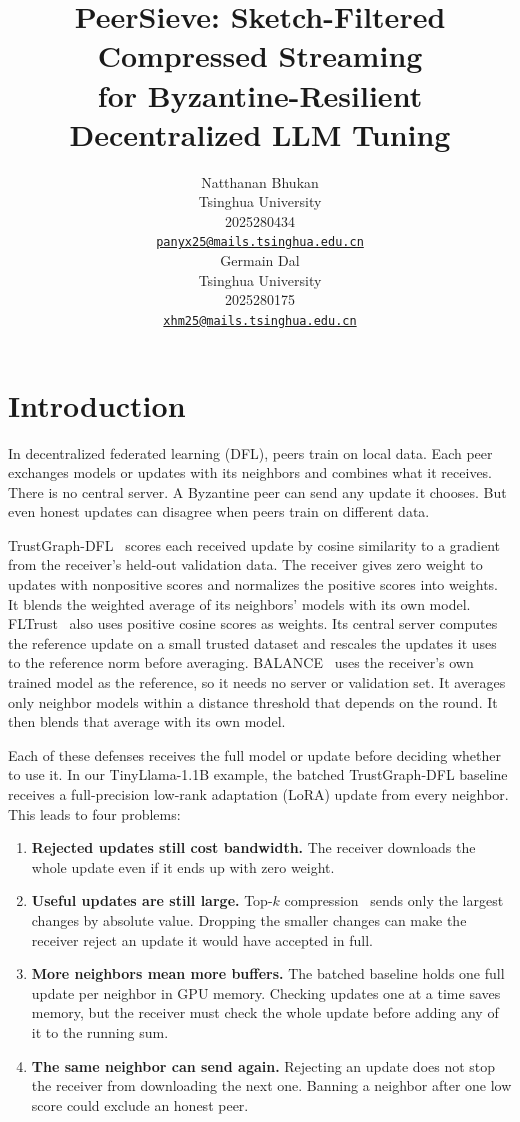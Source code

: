 \documentclass{article}
\title{PeerSieve: Sketch-Filtered Compressed Streaming\\for Byzantine-Resilient Decentralized LLM Tuning}
\author{%
  Natthanan Bhukan \\
  Tsinghua University \\
  2025280434 \\
  \href{mailto:panyx25@mails.tsinghua.edu.cn}{\texttt{panyx25@mails.tsinghua.edu.cn}} \\
  \And
  Germain Dal \\
  Tsinghua University \\
  2025280175 \\
  \href{mailto:xhm25@mails.tsinghua.edu.cn}{\texttt{xhm25@mails.tsinghua.edu.cn}} \\
}
\begin{document}
\raggedbottom
\maketitle

\section{Introduction}
\label{sec:motivation}

In decentralized federated learning (DFL), peers train on local data. Each peer exchanges models or updates with its neighbors and combines what it receives. There is no central server. A Byzantine peer can send any update it chooses. But even honest updates can disagree when peers train on different data.

TrustGraph-DFL~\cite{trustgraph2026} scores each received update by cosine similarity to a gradient from the receiver's held-out validation data. The receiver gives zero weight to updates with nonpositive scores and normalizes the positive scores into weights. It blends the weighted average of its neighbors' models with its own model. FLTrust~\cite{cao2021fltrust} also uses positive cosine scores as weights. Its central server computes the reference update on a small trusted dataset and rescales the updates it uses to the reference norm before averaging. BALANCE~\cite{fang2024balance} uses the receiver's own trained model as the reference, so it needs no server or validation set. It averages only neighbor models within a distance threshold that depends on the round. It then blends that average with its own model.

Each of these defenses receives the full model or update before deciding whether to use it. In our TinyLlama-1.1B example, the batched TrustGraph-DFL baseline receives a full-precision low-rank adaptation (LoRA) update from every neighbor. This leads to four problems:
\begin{enumerate}
  \item \textbf{Rejected updates still cost bandwidth.} The receiver downloads the whole update even if it ends up with zero weight.
  \item \textbf{Useful updates are still large.} Top-$k$ compression~\cite{karimireddy2019efsgd} sends only the largest changes by absolute value. Dropping the smaller changes can make the receiver reject an update it would have accepted in full.
  \item \textbf{More neighbors mean more buffers.} The batched baseline holds one full update per neighbor in GPU memory. Checking updates one at a time saves memory, but the receiver must check the whole update before adding any of it to the running sum.
  \item \textbf{The same neighbor can send again.} Rejecting an update does not stop the receiver from downloading the next one. Banning a neighbor after one low score could exclude an honest peer.
\end{enumerate}
\end{document}
